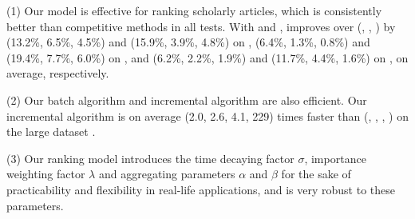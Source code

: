 \sstab(1) Our model \ensemblerank is effective for ranking scholarly articles, which is consistently better than competitive methods in all tests. With \recom and \fcita, \ensemblerank improves \PairAcc over (\pagerank, \futurerank, \hhgrank) by
(13.2\%, 6.5\%, 4.5\%) and (15.9\%, 3.9\%, 4.8\%) on \aan,
(6.4\%, 1.3\%, 0.8\%) and (19.4\%, 7.7\%, 6.0\%) on \aminer, and
(6.2\%, 2.2\%, 1.9\%) and (11.7\%, 4.4\%, 1.6\%) on \magdata, on average, respectively.


\sstab(2) Our batch algorithm \batensemble and incremental algorithm \incensemble are also efficient.
%
Our incremental algorithm \incensemble is on average (2.0, 2.6, 4.1, 229) times faster than (\batensemble, \powensemble, \futurerank, \hhgrank)  on the large dataset \magdata.




\sstab(3) Our ranking model \ensemblerank introduces the time decaying factor $\sigma$, importance weighting factor $\lambda$ and aggregating parameters $\alpha$ and $\beta$ for the sake of practicability and flexibility in real-life applications, and \ensemblerank is very robust to these parameters.


